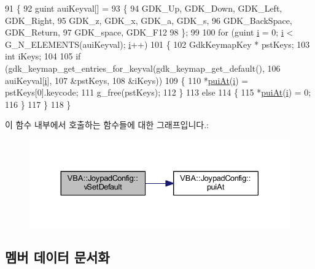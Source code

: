 \begin{DoxyCode}
91 \{
92   guint auiKeyval[] =
93   \{
94     GDK\_Up, GDK\_Down, GDK\_Left, GDK\_Right,
95     GDK\_z, GDK\_x, GDK\_a, GDK\_s,
96     GDK\_BackSpace, GDK\_Return,
97     GDK\_space, GDK\_F12
98   \};
99 
100   \textcolor{keywordflow}{for} (guint \mbox{\hyperlink{expr-lex_8cpp_acb559820d9ca11295b4500f179ef6392}{i}} = 0; \mbox{\hyperlink{expr-lex_8cpp_acb559820d9ca11295b4500f179ef6392}{i}} < G\_N\_ELEMENTS(auiKeyval); \mbox{\hyperlink{expr-lex_8cpp_acb559820d9ca11295b4500f179ef6392}{i}}++)
101   \{
102     GdkKeymapKey * pstKeys;
103     \textcolor{keywordtype}{int} iKeys;
104 
105     \textcolor{keywordflow}{if} (gdk\_keymap\_get\_entries\_for\_keyval(gdk\_keymap\_get\_default(),
106                                           auiKeyval[\mbox{\hyperlink{expr-lex_8cpp_acb559820d9ca11295b4500f179ef6392}{i}}],
107                                           &pstKeys,
108                                           &iKeys))
109     \{
110       *\mbox{\hyperlink{class_v_b_a_1_1_joypad_config_afa304227fa214176c874619365ffc445}{puiAt}}(\mbox{\hyperlink{expr-lex_8cpp_acb559820d9ca11295b4500f179ef6392}{i}}) = pstKeys[0].keycode;
111       g\_free(pstKeys);
112     \}
113     \textcolor{keywordflow}{else}
114     \{
115       *\mbox{\hyperlink{class_v_b_a_1_1_joypad_config_afa304227fa214176c874619365ffc445}{puiAt}}(\mbox{\hyperlink{expr-lex_8cpp_acb559820d9ca11295b4500f179ef6392}{i}}) = 0;
116     \}
117   \}
118 \}
\end{DoxyCode}
이 함수 내부에서 호출하는 함수들에 대한 그래프입니다.\+:
\nopagebreak
\begin{figure}[H]
\begin{center}
\leavevmode
\includegraphics[width=330pt]{class_v_b_a_1_1_joypad_config_af9f282b555d910519ce2fa03d5c66dda_cgraph}
\end{center}
\end{figure}


\subsection{멤버 데이터 문서화}
\mbox{\label{class_v_b_a_1_1_joypad_config_afd5a199c5dccb3d838f181a620b1fd33}} 
